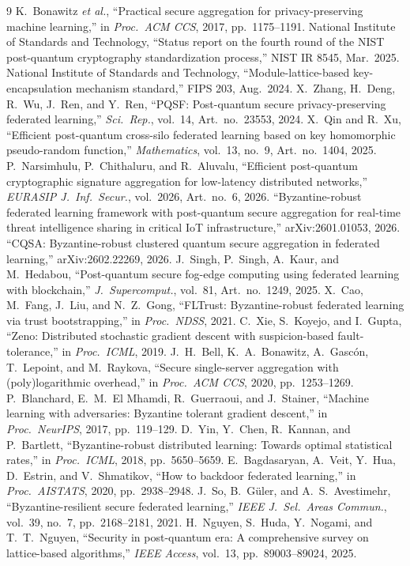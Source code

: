 \documentclass[conference]{IEEEtran}
\begin{document}
\begin{thebibliography}{9}
 K.\ Bonawitz \emph{et al.}, ``Practical secure aggregation
for privacy-preserving machine learning,'' in \emph{Proc.\ ACM CCS}, 2017,
pp.\ 1175--1191.
 National Institute of Standards and Technology, ``Status report
on the fourth round of the NIST post-quantum cryptography standardization process,''
NIST IR 8545, Mar.\ 2025.
 National Institute of Standards and Technology,
``Module-lattice-based key-encapsulation mechanism standard,'' FIPS 203, Aug.\ 2024.
 X.\ Zhang, H.\ Deng, R.\ Wu, J.\ Ren, and Y.\ Ren, ``PQSF:
Post-quantum secure privacy-preserving federated learning,'' \emph{Sci.\ Rep.},
vol.\ 14, Art.\ no.\ 23553, 2024.
 X.\ Qin and R.\ Xu, ``Efficient post-quantum cross-silo
federated learning based on key homomorphic pseudo-random function,''
\emph{Mathematics}, vol.\ 13, no.\ 9, Art.\ no.\ 1404, 2025.
 P.\ Narsimhulu, P.\ Chithaluru, and R.\ Aluvalu,
``Efficient post-quantum cryptographic signature aggregation for low-latency
distributed networks,'' \emph{EURASIP J.\ Inf.\ Secur.}, vol.\ 2026, Art.\ no.\ 6, 2026.
 ``Byzantine-robust federated learning framework with
post-quantum secure aggregation for real-time threat intelligence sharing in
critical IoT infrastructure,'' arXiv:2601.01053, 2026.
 ``CQSA: Byzantine-robust clustered quantum secure aggregation in
federated learning,'' arXiv:2602.22269, 2026.
 J.\ Singh, P.\ Singh, A.\ Kaur, and M.\ Hedabou,
``Post-quantum secure fog-edge computing using federated learning with blockchain,''
\emph{J.\ Supercomput.}, vol.\ 81, Art.\ no.\ 1249, 2025.
 X.\ Cao, M.\ Fang, J.\ Liu, and N.\ Z.\ Gong, ``FLTrust:
Byzantine-robust federated learning via trust bootstrapping,'' in \emph{Proc.\ NDSS},
2021.
 C.\ Xie, S.\ Koyejo, and I.\ Gupta, ``Zeno: Distributed stochastic
gradient descent with suspicion-based fault-tolerance,'' in \emph{Proc.\ ICML}, 2019.
 J.\ H.\ Bell, K.\ A.\ Bonawitz, A.\ Gasc\'on, T.\ Lepoint, and
M.\ Raykova, ``Secure single-server aggregation with (poly)logarithmic overhead,''
in \emph{Proc.\ ACM CCS}, 2020, pp.\ 1253--1269.
 P.\ Blanchard, E.\ M.\ El Mhamdi, R.\ Guerraoui, and
J.\ Stainer, ``Machine learning with adversaries: Byzantine tolerant gradient
descent,'' in \emph{Proc.\ NeurIPS}, 2017, pp.\ 119--129.
 D.\ Yin, Y.\ Chen, R.\ Kannan, and P.\ Bartlett,
``Byzantine-robust distributed learning: Towards optimal statistical rates,'' in
\emph{Proc.\ ICML}, 2018, pp.\ 5650--5659.
 E.\ Bagdasaryan, A.\ Veit, Y.\ Hua, D.\ Estrin, and
V.\ Shmatikov, ``How to backdoor federated learning,'' in \emph{Proc.\ AISTATS},
2020, pp.\ 2938--2948.
 J.\ So, B.\ G\"uler, and A.\ S.\ Avestimehr,
``Byzantine-resilient secure federated learning,'' \emph{IEEE J.\ Sel.\ Areas
Commun.}, vol.\ 39, no.\ 7, pp.\ 2168--2181, 2021.
 H.\ Nguyen, S.\ Huda, Y.\ Nogami, and T.\ T.\ Nguyen,
``Security in post-quantum era: A comprehensive survey on lattice-based
algorithms,'' \emph{IEEE Access}, vol.\ 13, pp.\ 89003--89024, 2025.
\end{thebibliography}
\end{document}
